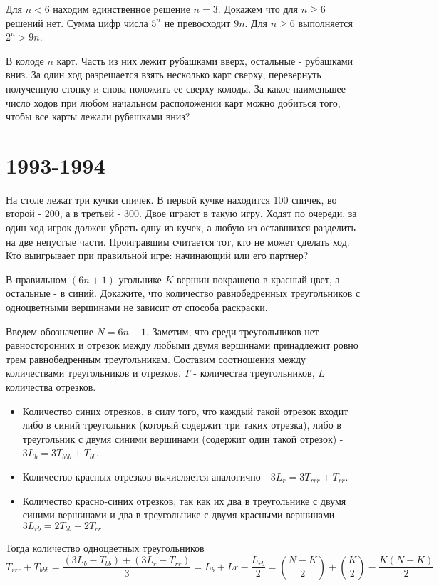 \documentclass[11pt, a4paper]{template}
\begin{document}
\begin{solution}
Для $n < 6$ находим единственное решение $n = 3$. Докажем что для $n \geqslant 6$
решений нет. Сумма цифр числа $5^{n}$ не превосходит $9n$. Для $n \geqslant 6$ выполняется $2^{n} > 9n$.
\end{solution}

\begin{exercise}
В колоде $n$ карт. Часть из них лежит рубашками вверх, остальные - рубашками вниз. За один ход разрешается взять несколько карт сверху, перевернуть полученную стопку и снова положить ее сверху колоды. За какое наименьшее число ходов при любом начальном расположении карт можно добиться того, чтобы все карты лежали рубашками вниз?
\end{exercise}

\chapter{1993-1994}

\begin{exercise}
На столе лежат три кучки спичек. В первой кучке находится 100 спичек, во второй - 200, а в третьей - 300. Двое играют в такую игру. Ходят по очереди, за один ход игрок должен убрать одну из кучек, а любую из оставшихся разделить на две непустые части. Проигравшим считается тот, кто не может сделать ход. Кто выигрывает при правильной игре: начинающий или его партнер?
\end{exercise}

\begin{exercise}
В правильном $(6n+1)$-угольнике $K$ вершин покрашено в красный цвет, а остальные - в синий. Докажите, что количество равнобедренных треугольников с одноцветными вершинами не зависит от способа раскраски.
\end{exercise}

\begin{solution}
Введем обозначение $N = 6n + 1$. Заметим, что среди треугольников нет равносторонних и отрезок между любыми двумя вершинами принадлежит ровно трем равнобедренным треугольникам. Составим соотношения между количествами треугольников и отрезков. $T$ - количества треугольников, $L$  количества отрезков.
\begin{itemize}
\item Количество синих отрезков, в силу того, что каждый такой отрезок входит либо в синий треугольник (который содержит три таких отрезка), либо в треугольник с двумя синими вершинами (содержит один такой отрезок) - $3L_{b} = 3 T_{bbb} + T_{bb}$.
\item Количество красных отрезков вычисляется аналогично - $3L_{r} = 3T_{rrr} + T_{rr}$.
\item Количество красно-синих отрезков, так как их два в треугольнике с двумя синими вершинами и два в треугольнике с двумя красными вершинами - $3L_{rb} = 2T_{bb}+2T_{rr}$
\end{itemize}
Тогда количество одноцветных треугольников
$$
T_{rrr} + T_{bbb} = \frac{(3L_{b} - T_{bb}) + (3L_{r} - T_{rr})}{3} = L_{b} + L{r} - \frac{L_{rb}}{2} = \binom{N - K}{2} + \binom{K}{2} - \frac{K(N - K)}{2}
$$
\end{solution}
\end{document}
